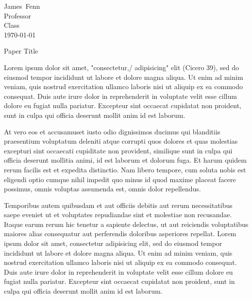 \documentclass[12pt]{article}
\newcommand{\papertitle}{Paper Title}
\newcommand{\authorfirst}{James}
\newcommand{\authorlast}{Fenn}
\newcommand{\paperclass}{Class}
\newcommand{\paperprof}{Professor}
\begin{document}
\begin{flushleft}

\authorfirst~\authorlast\\
\paperprof\\
\paperclass\\
\today\\


\begin{center}
\papertitle
\end{center}


\setlength{\parindent}{0.5in}

Lorem ipsum dolor sit amet, "consectetur,/ adipisicing" elit (Cicero 39), sed do eiusmod tempor incididunt ut labore et dolore magna aliqua. Ut enim ad minim veniam, quis nostrud exercitation ullamco laboris nisi ut aliquip ex ea commodo consequat. Duis aute irure dolor in reprehenderit in voluptate velit esse cillum dolore eu fugiat nulla pariatur. Excepteur sint occaecat cupidatat non proident, sunt in culpa qui officia deserunt mollit anim id est laborum.

At vero eos et accusamus\footnotemark  et iusto odio dignissimos ducimus qui blanditiis praesentium voluptatum deleniti atque corrupti quos dolores et quas molestias excepturi sint occaecati cupiditate non provident, similique sunt in culpa qui officia deserunt mollitia animi, id est laborum et dolorum fuga. Et harum quidem rerum facilis est et expedita distinctio. Nam libero tempore, cum soluta nobis est eligendi optio cumque nihil impedit quo minus id quod maxime placeat facere possimus, omnis voluptas assumenda est, omnis dolor repellendus. 

Temporibus autem quibusdam et aut officiis debitis aut rerum necessitatibus saepe eveniet ut et voluptates repudiandae sint et molestiae non recusandae. Itaque earum rerum hic tenetur a sapiente delectus, ut aut reiciendis voluptatibus maiores alias consequatur aut perferendis doloribus asperiores repellat. Lorem ipsum dolor sit amet, consectetur adipisicing elit, sed do eiusmod tempor incididunt ut labore et dolore magna aliqua. Ut enim ad minim veniam, quis nostrud exercitation ullamco laboris nisi ut aliquip ex ea commodo consequat. Duis aute irure dolor in reprehenderit in voluptate velit esse cillum dolore eu fugiat nulla pariatur. Excepteur sint occaecat cupidatat non proident, sunt in culpa qui officia deserunt mollit anim id est laborum.


\end{flushleft}
\end{document}
